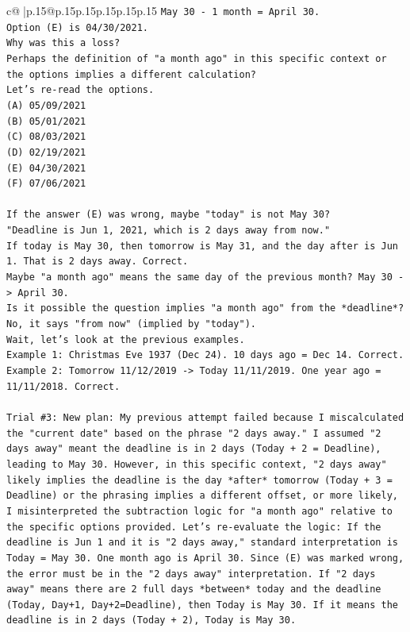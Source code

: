 \documentclass{article}
\begin{document}
{\begin{supertabular}{c@{$\;$}|p{.15\linewidth}@{}p{.15\linewidth}p{.15\linewidth}p{.15\linewidth}p{.15\linewidth}p{.15\linewidth}}
{{{\texttt{May 30 {-} 1 month = April 30.} \\
\texttt{Option (E) is 04/30/2021.} \\
\texttt{Why was this a loss?} \\
\texttt{Perhaps the definition of "a month ago" in this specific context or the options implies a different calculation?} \\
\texttt{Let's re{-}read the options.} \\
\texttt{(A) 05/09/2021} \\
\texttt{(B) 05/01/2021} \\
\texttt{(C) 08/03/2021} \\
\texttt{(D) 02/19/2021} \\
\texttt{(E) 04/30/2021} \\
\texttt{(F) 07/06/2021} \\
\\ 
\texttt{If the answer (E) was wrong, maybe "today" is not May 30?} \\
\texttt{"Deadline is Jun 1, 2021, which is 2 days away from now."} \\
\texttt{If today is May 30, then tomorrow is May 31, and the day after is Jun 1. That is 2 days away. Correct.} \\
\texttt{Maybe "a month ago" means the same day of the previous month? May 30 {-}> April 30.} \\
\texttt{Is it possible the question implies "a month ago" from the *deadline*? No, it says "from now" (implied by "today").} \\
\texttt{Wait, let's look at the previous examples.} \\
\texttt{Example 1: Christmas Eve 1937 (Dec 24). 10 days ago = Dec 14. Correct.} \\
\texttt{Example 2: Tomorrow 11/12/2019 {-}> Today 11/11/2019. One year ago = 11/11/2018. Correct.} \\
\\ 
\texttt{Trial \#3: New plan: My previous attempt failed because I miscalculated the "current date" based on the phrase "2 days away." I assumed "2 days away" meant the deadline is in 2 days (Today + 2 = Deadline), leading to May 30. However, in this specific context, "2 days away" likely implies the deadline is the day *after* tomorrow (Today + 3 = Deadline) or the phrasing implies a different offset, or more likely, I misinterpreted the subtraction logic for "a month ago" relative to the specific options provided. Let's re{-}evaluate the logic: If the deadline is Jun 1 and it is "2 days away," standard interpretation is Today = May 30. One month ago is April 30. Since (E) was marked wrong, the error must be in the "2 days away" interpretation. If "2 days away" means there are 2 full days *between* today and the deadline (Today, Day+1, Day+2=Deadline), then Today is May 30. If it means the deadline is in 2 days (Today + 2), Today is May 30.} \\
}}}
\end{supertabular}}
\end{document}
